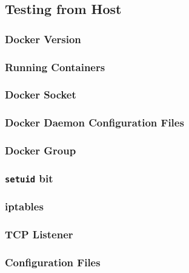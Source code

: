 \subsection{Testing from Host}

\subsubsection{Docker Version}

\subsubsection{Running Containers}

\subsubsection{Docker Socket}

\subsubsection{Docker Daemon Configuration Files}

\subsubsection{Docker Group}

\subsubsection{\texorpdfstring{\lstinline{setuid}}{setuid} bit}

\subsubsection{\texorpdfstring{iptables}{iptables}}

\subsubsection{TCP Listener}

\subsubsection{Configuration Files}
